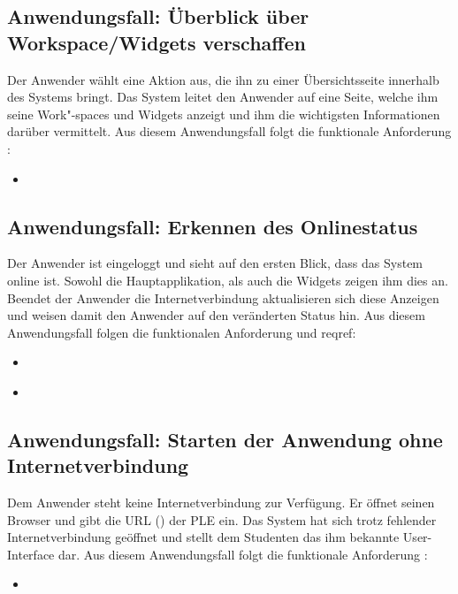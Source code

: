 \subsection{Anwendungsfall: Überblick über Workspace/Widgets verschaffen}
Der Anwender wählt eine Aktion aus, die ihn zu einer Übersichtsseite innerhalb des Systems bringt. Das System leitet den Anwender auf eine Seite, welche ihm seine Work"-spaces und Widgets anzeigt und ihm die wichtigsten Informationen darüber vermittelt. Aus diesem Anwendungsfall folgt die funktionale Anforderung :
\begin{itemize}
 \item \requirementf{\requirementDashboard}\label{requirementDashboard}
\end{itemize}

\subsection{Anwendungsfall: Erkennen des Onlinestatus}
Der Anwender ist eingeloggt und sieht auf den ersten Blick, dass das System online ist. Sowohl die Hauptapplikation, als auch die Widgets zeigen ihm dies an. Beendet der Anwender die Internetverbindung aktualisieren sich diese Anzeigen und weisen damit den Anwender auf den veränderten Status hin. Aus diesem Anwendungsfall folgen die funktionalen Anforderung  und reqref{\requirementOnlineStatusInformUser}:
\begin{itemize}
 \item \requirementf{\requirementCheckOnlineStatus}\label{requirementCheckOnlineStatus}
 \item \requirementf{\requirementOnlineStatusInformUser}\label{requirementOnlineStatusInformUser}
\end{itemize}

\subsection{Anwendungsfall: Starten der Anwendung ohne Internetverbindung}
Dem Anwender steht keine Internetverbindung zur Verfügung. Er öffnet seinen Browser und gibt die \acs{URL} () der \ac{PLE} ein. Das System hat sich trotz fehlender Internetverbindung geöffnet und stellt dem Studenten das ihm bekannte User-Interface dar. Aus diesem Anwendungsfall folgt die funktionale Anforderung :
\begin{itemize}
 \item \requirementf{\requirementOfflineStart}\label{requirementOfflineStart}
\end{itemize}

